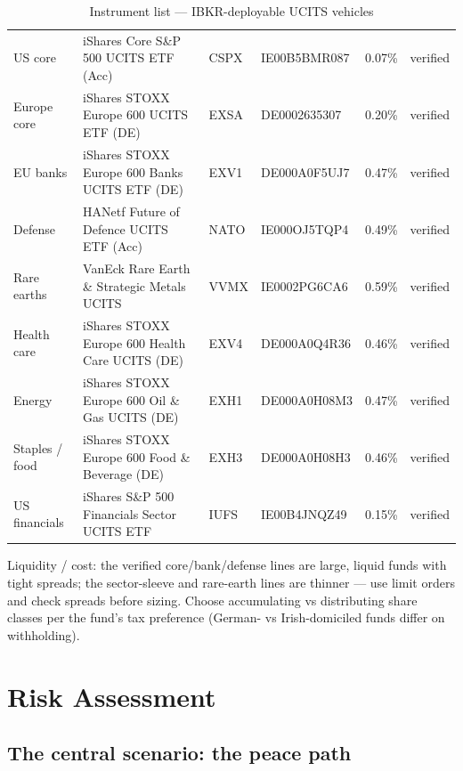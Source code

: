 \documentclass[11pt,a4paper]{article}
\begin{document}
\begin{table}[htbp]
\caption{Instrument list --- IBKR-deployable UCITS vehicles}
\small
\begin{tabularx}{\linewidth}{P{1.9cm} L P{1.2cm} P{2.6cm} P{1.1cm} P{1.3cm}}
\toprule
{} &  &  &  &  &  \\
\midrule
US core & iShares Core S\&P 500 UCITS ETF (Acc) & CSPX & IE00B5BMR087 & 0.07\% & verified \\
Europe core & iShares STOXX Europe 600 UCITS ETF (DE) & EXSA & DE0002635307 & 0.20\% & verified \\
EU banks & iShares STOXX Europe 600 Banks UCITS ETF (DE) & EXV1 & DE000A0F5UJ7 & 0.47\% & verified \\
Defense & HANetf Future of Defence UCITS ETF (Acc) & NATO & IE000OJ5TQP4 & 0.49\% & verified \\
Rare earths & VanEck Rare Earth \& Strategic Metals UCITS & VVMX & IE0002PG6CA6 & 0.59\% & verified \\
Health care & iShares STOXX Europe 600 Health Care UCITS (DE) & EXV4 & DE000A0Q4R36 & 0.46\% & verified \\
Energy & iShares STOXX Europe 600 Oil \& Gas UCITS (DE) & EXH1 & DE000A0H08M3 & 0.47\% & verified \\
Staples / food & iShares STOXX Europe 600 Food \& Beverage (DE) & EXH3 & DE000A0H08H3 & 0.46\% & verified \\
US financials & iShares S\&P 500 Financials Sector UCITS ETF & IUFS & IE00B4JNQZ49 & 0.15\% & verified \\
\bottomrule
\end{tabularx}
\end{table}

Liquidity / cost: the verified core/bank/defense lines are large, liquid funds with tight spreads; the sector-sleeve and rare-earth lines are thinner --- use limit orders and check spreads before sizing. Choose accumulating vs distributing share classes per the fund's tax preference (German- vs Irish-domiciled funds differ on withholding).

\section{Risk Assessment}

\subsection{The central scenario: the peace path}
\end{document}
